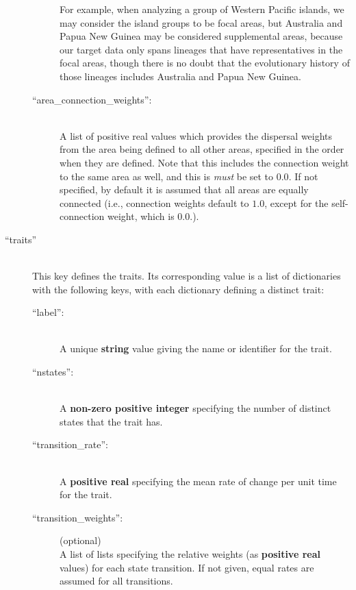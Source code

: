 \documentclass[11pt,openany]{memoir} %
\begin{document}
\begin{description}
\begin{description}
                For example, when analyzing a group of Western Pacific islands, we may consider the island groups to be focal areas, but Australia and Papua New Guinea may be considered supplemental areas, because our target data only spans lineages that have representatives in the focal areas, though there is no doubt that the evolutionary history of those lineages includes Australia and Papua New Guinea.
            \item[``area\_connection\_weights'':] \hfill \\
                A list of positive real values which provides the dispersal weights from the area being defined to all other areas, specified in the order when they are defined.
                Note that this includes the connection weight to the same area as well, and this is \textit{must} be set to $0.0$.
                If not specified, by default it is assumed that all areas are equally connected (i.e., connection weights default to $1.0$, except for the self-connection weight, which is $0.0$.).
        \end{description}

    \item[``traits'']  \hfill \\
        This key defines the traits.
        Its corresponding value is a list of dictionaries with the following keys, with each dictionary defining a distinct trait:
        \begin{description}
            \item[``label'':] \hfill \\
                A unique \textbf{string} value giving the name or identifier for the trait.
            \item[``nstates'':] \hfill \\
                A \textbf{non-zero positive integer} specifying the number of distinct states that the trait has.
            \item[``transition\_rate'':] \hfill \\
                A \textbf{positive real} specifying the mean rate of change per unit time for the trait.
            \item[``transition\_weights'':] (optional) \hfill \\
                A list of lists specifying the relative weights (as \textbf{positive real} values) for each state transition. If not given, equal rates are assumed for all transitions.
        \end{description}


\end{description}
\end{document}

